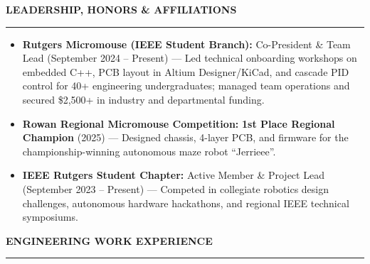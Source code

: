 \documentclass[10pt]{article}
\newcommand{\Section}[1]{%
  \vspace{4.5pt}%
  \textbf{\MakeUppercase{#1}}\par\vspace{-3.5pt}%
  \rule{\linewidth}{0.55pt}\par\vspace{2.5pt}%
}
\begin{document}
\Section{Leadership, Honors \& Affiliations}
\begin{itemize}[leftmargin=0.15in, label={}, itemsep=1.5pt, topsep=1.0pt]
  \item \textbf{Rutgers Micromouse (IEEE Student Branch):} Co-President \& Team Lead (September 2024 -- Present) --- Led technical onboarding workshops on embedded C++, PCB layout in Altium Designer/KiCad, and cascade PID control for 40+ engineering undergraduates; managed team operations and secured \$2,500+ in industry and departmental funding.
  \item \textbf{Rowan Regional Micromouse Competition:} \textbf{1st Place Regional Champion} (2025) --- Designed chassis, 4-layer PCB, and firmware for the championship-winning autonomous maze robot ``Jerrieee''.
  \item \textbf{IEEE Rutgers Student Chapter:} Active Member \& Project Lead (September 2023 -- Present) --- Competed in collegiate robotics design challenges, autonomous hardware hackathons, and regional IEEE technical symposiums.
\end{itemize}

\newpage

\Section{Engineering Work Experience}
\end{document}
